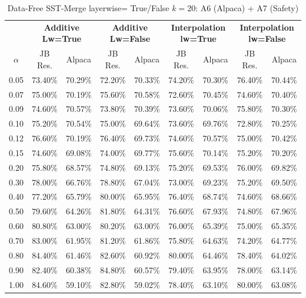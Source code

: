 \begin{table}[h]
\centering
\caption{Data-Free SST-Merge layerwise= True/False $k=20$: A6 (Alpaca) + A7 (Safety)}
\label{tab:res_a6_data_free_sst_20}
\begin{tabular}{c|cc|cc|cc|cc}
\hline
 & \multicolumn{2}{c|}{\textbf{Additive Lw=True}} & \multicolumn{2}{c|}{\textbf{Additive Lw=False}} & \multicolumn{2}{c|}{\textbf{Interpolation lw=True}}& \multicolumn{2}{c}{\textbf{Interpolation lw=False}} \\
$\alpha$ & JB Res. & Alpaca & JB Res. & Alpaca & JB Res. & Alpaca & JB Res. & Alpaca \\
\hline
0.05 & 73.40\% & 70.29\% & 72.20\% & 70.33\% & 74.20\% & 70.30\% & 76.40\% & 70.44\% \\
0.07 & 75.00\% & 70.19\% & 75.60\% & 70.58\% & 72.60\% & 70.45\% & 74.60\% & 70.40\% \\
0.09 & 74.60\% & 70.57\% & 73.80\% & 70.39\% & 73.60\% & 70.06\% & 75.80\% & 70.30\% \\
0.10 & 75.20\% & 70.54\% & 75.00\% & 69.64\% & 73.60\% & 69.76\% & 72.80\% & 70.25\% \\
0.12 & 76.60\% & 70.19\% & 76.40\% & 69.73\% & 74.60\% & 70.57\% & 75.00\% & 70.42\% \\
0.15 & 74.60\% & 69.08\% & 74.00\% & 69.77\% & 75.60\% & 70.14\% & 75.20\% & 70.20\% \\
0.20 & 75.80\% & 68.57\% & 74.80\% & 69.13\% & 75.20\% & 69.53\% & 76.00\% & 69.82\% \\
0.30 & 78.00\% & 66.76\% & 78.80\% & 67.04\% & 73.00\% & 69.23\% & 75.20\% & 69.50\% \\
0.40 & 77.20\% & 65.79\% & 80.00\% & 65.95\% & 76.40\% & 68.74\% & 74.60\% & 68.66\% \\
0.50 & 79.60\% & 64.26\% & 81.80\% & 64.31\% & 76.60\% & 67.93\% & 74.80\% & 67.96\% \\
0.60 & 80.80\% & 63.00\% & 80.20\% & 63.00\% & 76.00\% & 65.39\% & 75.00\% & 65.35\% \\
0.70 & 83.00\% & 61.95\% & 81.20\% & 61.86\% & 75.80\% & 64.63\% & 74.20\% & 64.77\% \\
0.80 & 84.40\% & 61.46\% & 82.60\% & 60.92\% & 80.00\% & 64.46\% & 78.40\% & 64.02\% \\
0.90 & 82.40\% & 60.38\% & 84.80\% & 60.57\% & 79.40\% & 63.95\% & 78.00\% & 63.14\% \\
1.00 & 84.60\% & 59.10\% & 82.80\% & 59.02\% & 78.40\% & 63.10\% & 80.00\% & 63.08\% \\
\hline
\end{tabular}
\end{table}
\FloatBarrier

